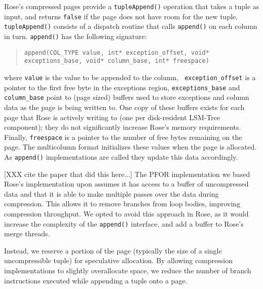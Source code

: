 \documentclass{vldb}
\newcommand{\rows}{Rose\xspace}
\newcommand{\rowss}{Rose's\xspace}
\begin{document}
\rowss compressed pages provide a {\tt tupleAppend()} operation that
takes a tuple as input, and returns {\tt false} if the page does not have
room for the new tuple.  {\tt tupleAppend()} consists of a dispatch
routine that calls {\tt append()} on each column in turn.
{\tt append()} has the
following signature:
\begin{quote}
  {\tt append(COL\_TYPE value, int* exception\_offset,
       void* exceptions\_base, void* column\_base, int* freespace) }
\end{quote}
where {\tt value} is the value to be appended to the column, {\tt
  exception\_offset} is a pointer to the first free byte in the
exceptions region, {\tt exceptions\_base} and {\tt column\_base} point
to (page sized) buffers used to store exceptions and column data as
the page is being written to.  One copy of these buffers exists for
each page that \rows is actively writing to (one per disk-resident
LSM-Tree component); they do not significantly increase \rowss memory
requirements.  Finally, {\tt freespace} is a pointer to the number of
free bytes remaining on the page.  The multicolumn format initializes
these values when the page is allocated.  As {\tt append()}
implementations are called they update this data accordingly.



[XXX cite the paper that did this here...] The PFOR implementation
we based \rowss implementation upon assumes it has access to
a buffer of uncompressed data and that it is able to make multiple
passes over the data during compression.  This allows it to remove
branches from loop bodies, improving compression throughput.  We opted
to avoid this approach in \rows, as it would increase the complexity
of the {\tt append()} interface, and add a buffer to \rowss merge threads.

Instead, we reserve a portion of the page (typically the size of a
single uncompressible tuple) for speculative allocation.  By allowing
compression implementations to slightly overallocate space, we reduce
the number of branch instructions executed while appending a tuple
onto a page.
\end{document}

